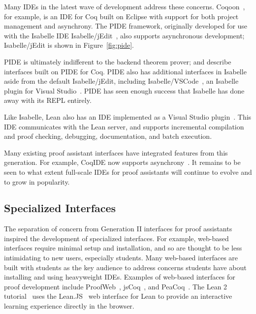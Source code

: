 Many IDEs in the latest wave of development address these concerns.
Coqoon~\citep{Faithfull2016}, for example, is an IDE for Coq built on Eclipse with support for both project management and asynchrony. 
The PIDE framework, originally developed
for use with the Isabelle IDE Isabelle/jEdit~\citep{Wenzel2014}, also supports asynchronous development;
Isabelle/jEdit is shown in Figure~\ref{fig:pide}.

PIDE is ultimately indifferent to the backend theorem prover;
\cite{Wenzel2013} and \cite{Barras2015} describe interfaces built on PIDE for Coq.
PIDE also has additional interfaces in Isabelle aside from the default
Isabelle/jEdit, including Isabelle/VSCode~\citep{isabelle-vscode}, an Isabelle plugin for Visual Studio~\citep{vscode}.
PIDE has seen enough success that Isabelle has done away with its REPL entirely.

Like Isabelle, Lean also has an IDE implemented as a Visual Studio plugin~\citep{lean-vscode}.
This IDE communicates with the Lean server, and supports 
incremental compilation and proof checking, debugging, documentation, and batch execution.

Many existing proof assistant interfaces have integrated features from this generation.
For example, CoqIDE now supports asynchrony~\citep{coqide}. It remains
to be seen to what extent full-scale IDEs for proof assistants will continue to evolve
and to grow in popularity.


\subsection{Specialized Interfaces}
\label{sec:specialized}

The separation of concern from Generation II interfaces for proof assistants inspired the development
of specialized interfaces. For example, web-based interfaces require minimal setup and installation,
and so are thought to be less intimidating to new users, especially students. 
Many web-based interfaces are built with students as the key audience to address concerns students have about installing and using
heavyweight IDEs. Examples of web-based interfaces for proof development include 
ProofWeb~\citep{kaliszyk2007web}, jsCoq~\citep{Gallego2016}, and PeaCoq~\citep{peacoq}.
The Lean 2 tutorial~\citep{lean-tutorial} uses the Lean.JS~\citep{lean-js} web interface for Lean to provide an interactive
learning experience directly in the browser.

